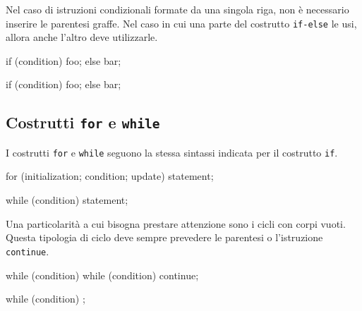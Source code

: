 Nel caso di istruzioni condizionali formate da una singola riga, non è necessario inserire le parentesi graffe.
Nel caso in cui una parte del costrutto \texttt{if-else} le usi, allora anche l'altro deve utilizzarle.

\begin{minipage}[t]{\cbwidth}
\begin{RightCode}
if (condition)
{
  foo;
}
else
{
  bar;
}
\end{RightCode}
\end{minipage}%
\hspace{\cbdistance}
\begin{minipage}[t]{\cbwidth}
\begin{ErrorCode}
if (condition)
{
  foo;
}
else
  bar;
\end{ErrorCode}
\end{minipage}

\subsection{Costrutti \texttt{for} e \texttt{while}}

I costrutti \texttt{for} e \texttt{while} seguono la stessa sintassi indicata per il costrutto \texttt{if}.

\begin{minipage}[t]{\rbwidth}
\begin{RightCode}
for (initialization; condition; update)
{
  statement;
}

while (condition)
{
  statement;
}
\end{RightCode}
\end{minipage}%

Una particolarità a cui bisogna prestare attenzione sono i cicli con corpi vuoti.
Questa tipologia di ciclo deve sempre prevedere le parentesi o l'istruzione \texttt{continue}.

\begin{minipage}[t]{\cbwidth}
\begin{RightCode}
while (condition) {}
while (condition) continue;
\end{RightCode}
\end{minipage}%
\hspace{\cbdistance}
\begin{minipage}[t]{\cbwidth}
\begin{ErrorCode}
while (condition) ;
\end{ErrorCode}
\end{minipage}

